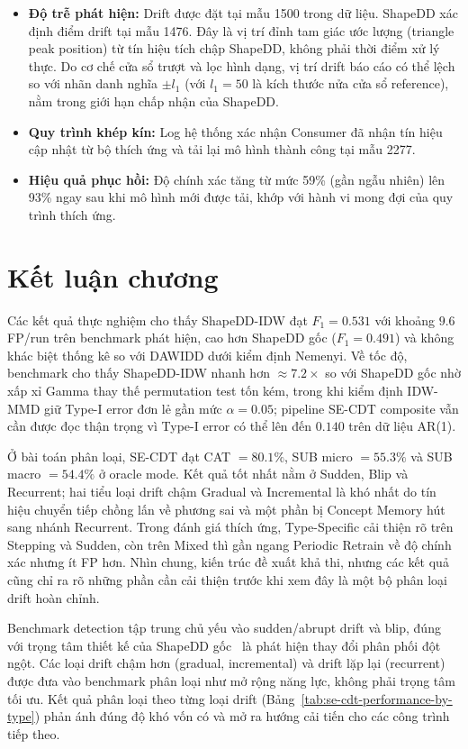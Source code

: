 \begin{itemize}
	\item \textbf{Độ trễ phát hiện:} Drift được đặt tại mẫu 1500 trong dữ liệu. ShapeDD xác định điểm drift tại mẫu 1476. Đây là vị trí đỉnh tam giác ước lượng (triangle peak position) từ tín hiệu tích chập ShapeDD, không phải thời điểm xử lý thực. Do cơ chế cửa sổ trượt và lọc hình dạng, vị trí drift báo cáo có thể lệch so với nhãn danh nghĩa $\pm l_1$ (với $l_1 = 50$ là kích thước nửa cửa sổ reference), nằm trong giới hạn chấp nhận của ShapeDD.
	\item \textbf{Quy trình khép kín:} Log hệ thống xác nhận Consumer đã nhận tín hiệu cập nhật từ bộ thích ứng và tải lại mô hình thành công tại mẫu 2277.
	\item \textbf{Hiệu quả phục hồi:} Độ chính xác tăng từ mức 59\% (gần ngẫu nhiên) lên 93\% ngay sau khi mô hình mới được tải, khớp với hành vi mong đợi của quy trình thích ứng.
\end{itemize}

\section{Kết luận chương}

Các kết quả thực nghiệm cho thấy ShapeDD-IDW đạt $F_1 = 0.531$ với khoảng $9.6$ FP/run trên benchmark phát hiện, cao hơn ShapeDD gốc ($F_1 = 0.491$) và không khác biệt thống kê so với DAWIDD dưới kiểm định Nemenyi. Về tốc độ, benchmark cho thấy ShapeDD-IDW nhanh hơn $\approx 7.2\times$ so với ShapeDD gốc nhờ xấp xỉ Gamma thay thế permutation test tốn kém, trong khi kiểm định IDW-MMD giữ Type-I error đơn lẻ gần mức $\alpha = 0.05$; pipeline SE-CDT composite vẫn cần được đọc thận trọng vì Type-I error có thể lên đến $0.140$ trên dữ liệu AR(1).

Ở bài toán phân loại, SE-CDT đạt CAT $=80.1\%$, SUB micro $=55.3\%$ và SUB macro $=54.4\%$ ở oracle mode. Kết quả tốt nhất nằm ở Sudden, Blip và Recurrent; hai tiểu loại drift chậm Gradual và Incremental là khó nhất do tín hiệu chuyển tiếp chồng lấn về phương sai và một phần bị Concept Memory hút sang nhánh Recurrent. Trong đánh giá thích ứng, Type-Specific cải thiện rõ trên Stepping và Sudden, còn trên Mixed thì gần ngang Periodic Retrain về độ chính xác nhưng ít FP hơn. Nhìn chung, kiến trúc đề xuất khả thi, nhưng các kết quả cũng chỉ ra rõ những phần cần cải thiện trước khi xem đây là một bộ phân loại drift hoàn chỉnh.

Benchmark detection tập trung chủ yếu vào sudden/abrupt drift và blip, đúng với trọng tâm thiết kế của ShapeDD gốc~\cite{shapeDD2021} là phát hiện thay đổi phân phối đột ngột. Các loại drift chậm hơn (gradual, incremental) và drift lặp lại (recurrent) được đưa vào benchmark phân loại như mở rộng năng lực, không phải trọng tâm tối ưu. Kết quả phân loại theo từng loại drift (Bảng~\ref{tab:se-cdt-performance-by-type}) phản ánh đúng độ khó vốn có và mở ra hướng cải tiến cho các công trình tiếp theo.
